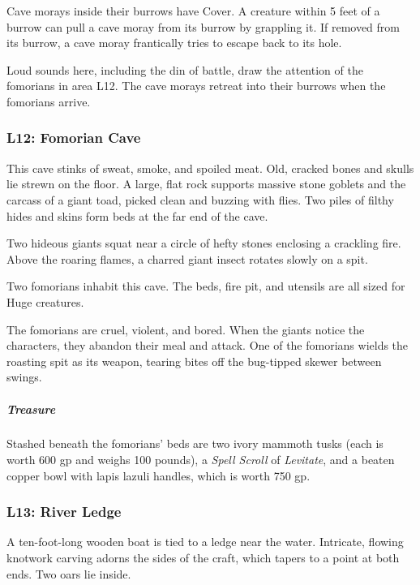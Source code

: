 \documentclass[10pt,a4paper,twoside,bg=print,twocolumn,openany,nodeprecatedcode]{dndbook}
\begin{document}
Cave morays inside their burrows have Cover. A creature within 5 feet of a burrow can pull a cave moray from its burrow by grappling it. If removed from its burrow, a cave moray frantically tries to escape back to its hole.

Loud sounds here, including the din of battle, draw the attention of the fomorians in area L12. The cave morays retreat into their burrows when the fomorians arrive.

\subsubsection{L12: Fomorian Cave}
\begin{DndReadAloud}{}
This cave stinks of sweat, smoke, and spoiled meat. Old, cracked bones and skulls lie strewn on the floor. A large, flat rock supports massive stone goblets and the carcass of a giant toad, picked clean and buzzing with flies. Two piles of filthy hides and skins form beds at the far end of the cave.

Two hideous giants squat near a circle of hefty stones enclosing a crackling fire. Above the roaring flames, a charred giant insect rotates slowly on a spit.

\end{DndReadAloud}

Two fomorians inhabit this cave. The beds, fire pit, and utensils are all sized for Huge creatures.

The fomorians are cruel, violent, and bored. When the giants notice the characters, they abandon their meal and attack. One of the fomorians wields the roasting spit as its weapon, tearing bites off the bug-tipped skewer between swings.

\subparagraph{Treasure}
Stashed beneath the fomorians' beds are two ivory mammoth tusks (each is worth 600 gp and weighs 100 pounds), a \textit{Spell Scroll} of \textit{Levitate}, and a beaten copper bowl with lapis lazuli handles, which is worth 750 gp.

\subsubsection{L13: River Ledge}
\begin{DndReadAloud}{}
A ten-foot-long wooden boat is tied to a ledge near the water. Intricate, flowing knotwork carving adorns the sides of the craft, which tapers to a point at both ends. Two oars lie inside.

\end{DndReadAloud}
\end{document}
